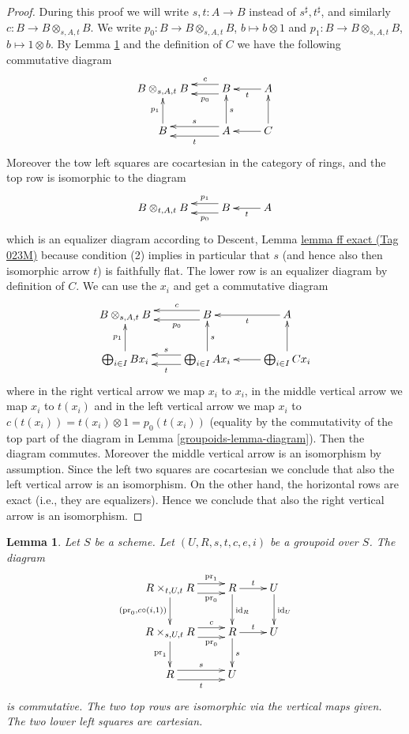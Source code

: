 \documentclass{amsart}
\theoremstyle{plain}
\newtheorem{lemma}[subsection]{Lemma}
\theoremstyle{definition}
\theoremstyle{remark}
\numberwithin{equation}{subsection}
\begin{document}
\begin{proof}
During this proof we will write $s, t : A \to B$ instead of
$s^\sharp, t^\sharp$, and similarly $c : B \to B \otimes_{s, A, t} B$.
We write $p_0 : B \to B \otimes_{s, A, t} B$, $b \mapsto b \otimes 1$ and
$p_1 : B \to B \otimes_{s, A, t} B$, $b \mapsto 1 \otimes b$. By
Lemma \ref{groupoids-lemma-diagram-pull}
and the definition of $C$ we have the following
commutative diagram
$$
\xymatrix{
B \otimes_{s, A, t} B &
B \ar@<-1ex>[l]_-c \ar@<1ex>[l]^-{p_0} &
A \ar[l]^t \\
B \ar[u]^{p_1} &
A \ar@<-1ex>[l]_s \ar@<1ex>[l]^t \ar[u]_s &
C \ar[u] \ar[l]
}
$$
Moreover the tow left squares are cocartesian in the category of rings, and
the top row is isomorphic to the diagram
$$
\xymatrix{
B \otimes_{t, A, t} B &
B \ar@<-1ex>[l]_-{p_1} \ar@<1ex>[l]^-{p_0} &
A \ar[l]^t
}
$$
which is an equalizer diagram according to
Descent, Lemma \href{https://stacks.math.columbia.edu/tag/023M}{lemma ff exact (Tag 023M)} because condition (2) implies
in particular that $s$ (and hence also then isomorphic arrow $t$)
is faithfully flat.
The lower row is an equalizer diagram by definition of $C$.
We can use the $x_i$ and get a commutative diagram
$$
\xymatrix{
B \otimes_{s, A, t} B &
B \ar@<-1ex>[l]_-c \ar@<1ex>[l]^-{p_0} &
A \ar[l]^t \\
\bigoplus_{i \in I} B x_i \ar[u]^{p_1} &
\bigoplus_{i \in I} A x_i \ar@<-1ex>[l]_s \ar@<1ex>[l]^t \ar[u]_s &
\bigoplus_{i \in I} C x_i \ar[u] \ar[l]
}
$$
where in the right vertical arrow we map $x_i$ to $x_i$,
in the middle vertical arrow we map $x_i$ to $t(x_i)$ and
in the left vertical arrow we map $x_i$ to
$c(t(x_i)) = t(x_i) \otimes 1 = p_0(t(x_i))$ (equality by the commutativity
of the top part of the diagram in Lemma \ref{groupoids-lemma-diagram}). Then the diagram
commutes. Moreover the middle vertical arrow is an isomorphism
by assumption. Since the left two squares are cocartesian we
conclude that also the left vertical arrow is an isomorphism.
On the other hand, the horizontal rows are exact (i.e., they are
equalizers). Hence we conclude that also the right vertical arrow
is an isomorphism.
\end{proof}


\begin{lemma}
\label{groupoids-lemma-diagram-pull}
Let $S$ be a scheme.
Let $(U, R, s, t, c, e, i)$ be a groupoid over $S$.
The diagram
\begin{equation}
\label{groupoids-equation-pull}
\xymatrix{
R \times_{t, U, t} R
\ar@<1ex>[r]^-{\text{pr}_1} \ar@<-1ex>[r]_-{\text{pr}_0}
\ar[d]_{(\text{pr}_0, c \circ (i, 1))} &
R \ar[r]^t \ar[d]^{\text{id}_R} &
U \ar[d]^{\text{id}_U} \\
R \times_{s, U, t} R
\ar@<1ex>[r]^-c \ar@<-1ex>[r]_-{\text{pr}_0} \ar[d]_{\text{pr}_1} &
R \ar[r]^t \ar[d]^s &
U \\
R \ar@<1ex>[r]^s \ar@<-1ex>[r]_t &
U
}
\end{equation}
is commutative. The two top rows are isomorphic via the vertical maps given.
The two lower left squares are cartesian.
\end{lemma}
\end{document}
